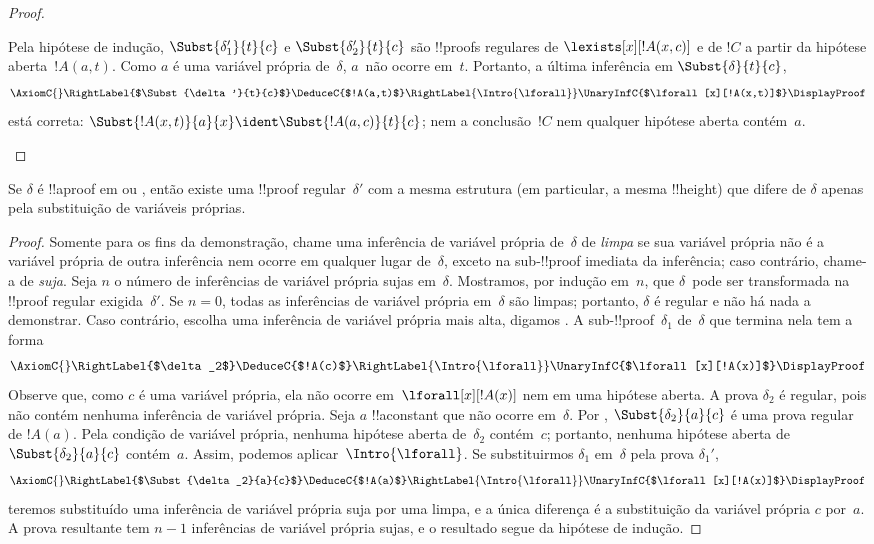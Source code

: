 \documentclass[../../../include/open-logic-section]{subfiles}
\begin{document}
\begin{proof}
\begin{enumerate}
    Pela hipótese de indução, $\Subst{\delta_1'}{t}{c}$ e
    $\Subst{\delta_2'}{t}{c}$ são !!{proof}s regulares de
    $\lexists[x][!A(x,c)]$ e de $!C$ a partir da hipótese
    aberta~$!A(a,t)$. Como $a$ é uma variável própria de~$\delta$,
    $a$~não ocorre em~$t$. Portanto, a última inferência em
    $\Subst{\delta}{t}{c}$,
    \[
    \AxiomC{}
    \RightLabel{$\Subst{\delta'}{t}{c}$}
    \DeduceC{$!A(a,t)$}
    \RightLabel{\Intro{\lforall}}
    \UnaryInfC{$\lforall[x][!A(x,t)]$}
    \DisplayProof
    \]
    está correta: $\Subst{!A(x,t)}{a}{x} \ident
    \Subst{!A(a,c)}{t}{c}$; nem a conclusão~$!C$ nem qualquer hipótese
    aberta contém~$a$.
  \end{enumerate}
\end{proof}

\begin{prop}
Se $\delta$ é !!a{proof} em  ou , então existe uma
!!{proof} regular~$\delta'$ com a mesma estrutura (em particular, a
mesma !!{height}) que difere de $\delta$ apenas pela substituição de
variáveis próprias.
\end{prop}

\begin{proof}
Somente para os fins da demonstração, chame uma inferência de variável
própria de~$\delta$ de \emph{limpa} se sua variável própria não é a
variável própria de outra inferência nem ocorre em qualquer lugar
de~$\delta$, exceto na sub-!!{proof} imediata da inferência; caso
contrário, chame-a de \emph{suja}. Seja $n$ o número de inferências de
variável própria sujas em~$\delta$. Mostramos, por indução em~$n$, que
$\delta$~pode ser transformada na !!{proof} regular exigida~$\delta'$.
Se $n=0$, todas as inferências de variável própria em~$\delta$ são
limpas; portanto, $\delta$ é regular e não há nada a demonstrar. Caso
contrário, escolha uma inferência de variável própria mais alta,
digamos \Intro{\lforall}. A sub-!!{proof}~$\delta_1$ de~$\delta$ que
termina nela tem a forma
    \[
    \AxiomC{}
    \RightLabel{$\delta_2$}
    \DeduceC{$!A(c)$}
    \RightLabel{\Intro{\lforall}}
    \UnaryInfC{$\lforall[x][!A(x)]$}
    \DisplayProof
    \]
Observe que, como $c$ é uma variável própria, ela não ocorre
em~$\lforall[x][!A(x)]$ nem em uma hipótese aberta. A prova $\delta_2$
é regular, pois não contém nenhuma inferência de variável própria.
Seja $a$ !!a{constant} que não ocorre em~$\delta$. Por
, $\Subst{\delta_2}{a}{c}$ é uma prova regular
de $!A(a)$. Pela condição de variável própria, nenhuma hipótese aberta
de~$\delta_2$ contém~$c$; portanto, nenhuma hipótese aberta de
$\Subst{\delta_2}{a}{c}$ contém~$a$. Assim, podemos
aplicar~$\Intro{\lforall}$. Se substituirmos $\delta_1$ em~$\delta$
pela prova $\delta_1'$,
    \[
    \AxiomC{}
    \RightLabel{$\Subst{\delta_2}{a}{c}$}
    \DeduceC{$!A(a)$}
    \RightLabel{\Intro{\lforall}}
    \UnaryInfC{$\lforall[x][!A(x)]$}
    \DisplayProof
    \]
teremos substituído uma inferência de variável própria suja por uma
limpa, e a única diferença é a substituição da variável própria $c$
por~$a$. A prova resultante tem $n-1$ inferências de variável própria
sujas, e o resultado segue da hipótese de indução.
\end{proof}
\end{document}

